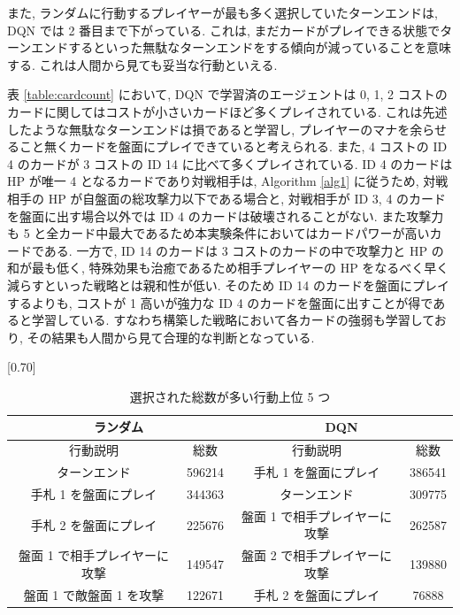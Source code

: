 \documentclass[twocolumn]{jarticle}
\begin{document}
  また, ランダムに行動するプレイヤーが最も多く選択していたターンエンドは, DQN では 2 番目まで下がっている. これは, まだカードがプレイできる状態でターンエンドするといった無駄なターンエンドをする傾向が減っていることを意味する. これは人間から見ても妥当な行動といえる.\par
  表 \ref{table:cardcount} において, DQN で学習済のエージェントは 0, 1, 2 コストのカードに関してはコストが小さいカードほど多くプレイされている. これは先述したような無駄なターンエンドは損であると学習し, プレイヤーのマナを余らせること無くカードを盤面にプレイできていると考えられる. 
  また, 4 コストの ID 4 のカードが 3 コストの ID 14 に比べて多くプレイされている. ID 4 のカードは HP が唯一 4 となるカードであり対戦相手は, Algorithm \ref{alg1} に従うため, 対戦相手の HP が自盤面の総攻撃力以下である場合と, 対戦相手が ID 3, 4 のカードを盤面に出す場合以外では ID 4 のカードは破壊されることがない. また攻撃力も 5 と全カード中最大であるため本実験条件においてはカードパワーが高いカードである. 一方で, ID 14 のカードは 3 コストのカードの中で攻撃力と HP の和が最も低く, 特殊効果も治癒であるため相手プレイヤーの HP をなるべく早く減らすといった戦略とは親和性が低い. そのため ID 14 のカードを盤面にプレイするよりも, コストが 1 高いが強力な ID 4 のカードを盤面に出すことが得であると学習している. すなわち構築した戦略において各カードの強弱も学習しており, その結果も人間から見て合理的な判断となっている. 
  

  \begin{table}[t]
    \centering
    \caption{選択された総数が多い行動上位 5 つ}
    \vspace{-0.3cm}
    \label{table:actioncount}
    \scalebox{0.68}[0.70]{
      \begin{tabular}{|cc|cc|}
        \hline
        \multicolumn{2}{|c|}{ランダム}      & \multicolumn{2}{c|}{DQN}       \\ \hline
        \multicolumn{1}{|c|}{行動説明} & 総数 & \multicolumn{1}{c|}{行動説明} & 総数 \\ \hline \hline
        \multicolumn{1}{|c|}{ターンエンド}    & 596214  & \multicolumn{1}{c|}{手札 1 を盤面にプレイ}    & 386541  \\ \hline
        \multicolumn{1}{|c|}{手札 1 を盤面にプレイ}    &  344363  & \multicolumn{1}{c|}{ターンエンド}    & 309775  \\ \hline
        \multicolumn{1}{|c|}{手札 2 を盤面にプレイ}    & 225676  & \multicolumn{1}{c|}{盤面 1 で相手プレイヤーに攻撃}    & 262587  \\ \hline
        \multicolumn{1}{|c|}{盤面 1 で相手プレイヤーに攻撃}    & 149547  & \multicolumn{1}{c|}{盤面 2 で相手プレイヤーに攻撃}    & 139880  \\ \hline
        \multicolumn{1}{|c|}{盤面 1 で敵盤面 1 を攻撃}    & 122671  & \multicolumn{1}{c|}{手札 2 を盤面にプレイ}    & 76888  \\ \hline
        \end{tabular}
    }
  \end{table}
\end{document}
